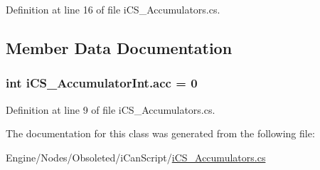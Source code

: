 Definition at line 16 of file i\+C\+S\+\_\+\+Accumulators.\+cs.



\subsection{Member Data Documentation}
\hypertarget{classi_c_s___accumulator_int_a6eafc15fa6d361a8535bff2d3aaf0cad}{
\subsubsection[{acc}]{\setlength{\rightskip}{0pt plus 5cm}int i\+C\+S\+\_\+\+Accumulator\+Int.\+acc = 0}}\label{classi_c_s___accumulator_int_a6eafc15fa6d361a8535bff2d3aaf0cad}


Definition at line 9 of file i\+C\+S\+\_\+\+Accumulators.\+cs.



The documentation for this class was generated from the following file\+:\begin{DoxyCompactItemize}
\item 
Engine/\+Nodes/\+Obsoleted/i\+Can\+Script/\hyperlink{i_c_s___accumulators_8cs}{i\+C\+S\+\_\+\+Accumulators.\+cs}\end{DoxyCompactItemize}
